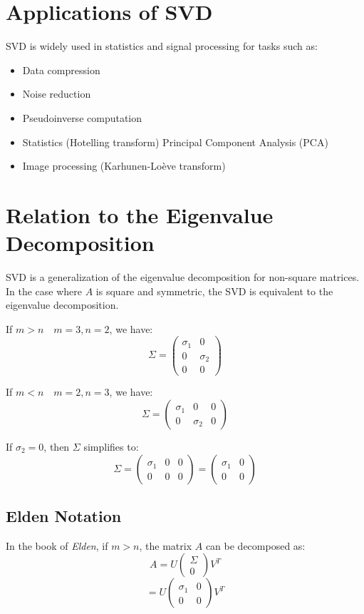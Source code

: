 \section{Applications of SVD}
SVD is widely used in statistics and signal processing for tasks such as:
\begin{itemize}
    \item Data compression
    \item Noise reduction
    \item Pseudoinverse computation
    \item Statistics (Hotelling transform)
    \subitem Principal Component Analysis (PCA)
    \item Image processing (Karhunen-Loève transform)
\end{itemize}

\section{Relation to the Eigenvalue Decomposition}
SVD is a generalization of the eigenvalue decomposition for non-square matrices. In the case where $A$ is square and symmetric, the SVD is equivalent to the eigenvalue decomposition.

If $m > n \quad m=3, n=2$, we have:
\[
\Sigma = \begin{pmatrix}
\sigma_1 & 0 \\
0 & \sigma_2 \\
0 & 0
\end{pmatrix}
\]

If $m < n \quad m=2, n=3$, we have:
\[
\Sigma = \begin{pmatrix}
\sigma_1 & 0 & 0 \\
0 & \sigma_2 & 0
\end{pmatrix}
\]

If $\sigma_2 = 0$, then $\Sigma$ simplifies to:
\[
\Sigma = \begin{pmatrix}
\sigma_1 & 0 & 0 \\
0 & 0 & 0
\end{pmatrix} = \begin{pmatrix}
\sigma_1 & 0 \\
0 & 0
\end{pmatrix}
\]

\subsection{Elden Notation}
In the book of \textit{Elden}, if $m > n$, the matrix $A$ can be decomposed as:
\[
A = U \begin{pmatrix}
\Sigma \\
0
\end{pmatrix} V^T
\]
\[
= U \begin{pmatrix}
\sigma_1 & 0 \\
0 & 0
\end{pmatrix} V^T
\]

